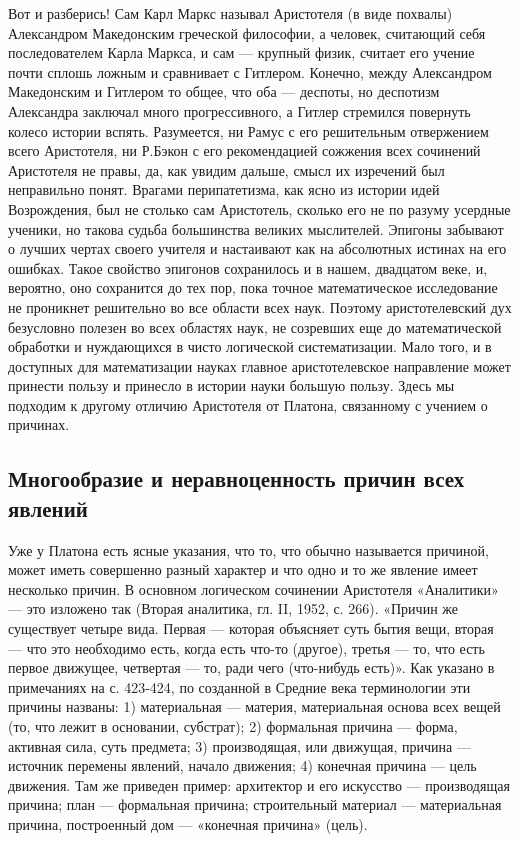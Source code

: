 Вот и разберись! Сам Карл Маркс называл Аристотеля (в виде похвалы)
Александром Македонским греческой философии, а человек, считающий себя
последователем Карла Маркса, и сам --- крупный физик, считает его
учение почти сплошь ложным и сравнивает с Гитлером. Конечно, между
Александром Македонским и Гитлером то общее, что оба --- деспоты, но
деспотизм Александра заключал много прогрессивного, а Гитлер стремился
повернуть колесо истории вспять. Разумеется, ни Рамус с его
решительным отвержением всего Аристотеля, ни Р.Бэкон с его
рекомендацией сожжения всех сочинений Аристотеля не правы, да, как
увидим дальше, смысл их изречений был неправильно понят. Врагами
перипатетизма, как ясно из истории идей Возрождения, был не столько
сам Аристотель, сколько его не по разуму усердные ученики, но такова
судьба большинства великих мыслителей. Эпигоны забывают о лучших
чертах своего учителя и настаивают как на абсолютных истинах на его
ошибках. Такое свойство эпигонов сохранилось и в нашем, двадцатом
веке, и, вероятно, оно сохранится до тех пор, пока точное
математическое исследование не проникнет решительно во все области
всех наук. Поэтому аристотелевский дух безусловно полезен во всех
областях наук, не созревших еще до математической обработки и
нуждающихся в чисто логической систематизации. Мало того, и в
доступных для математизации науках главное аристотелевское направление
может принести пользу и принесло в истории науки большую пользу.
Здесь мы подходим к другому отличию Аристотеля от Платона, связанному
с учением о причинах.

\subsection{Многообразие и неравноценность причин всех явлений}

Уже у Платона есть ясные указания, что то, что обычно называется
причиной, может иметь совершенно разный характер и что одно и то же
явление имеет несколько причин. В основном логическом сочинении
Аристотеля «Аналитики» --- это изложено так (Вторая аналитика, гл. II,
1952, с. 266). «Причин же существует четыре вида. Первая --- которая
объясняет суть бытия вещи, вторая --- что это необходимо есть, когда
есть что-то (другое), третья --- то, что есть первое движущее,
четвертая --- то, ради чего (что-нибудь есть)». Как указано в
примечаниях на с. 423-424, по созданной в Средние века терминологии
эти причины названы: 1) материальная --- материя, материальная основа
всех вещей (то, что лежит в основании, субстрат); 2) формальная
причина --- форма, активная сила, суть предмета; 3) производящая, или
движущая, причина --- источник перемены явлений, начало движения; 4)
конечная причина --- цель движения. Там же приведен пример: архитектор
и его искусство --- производящая причина; план --- формальная причина;
строительный материал --- материальная причина, построенный дом ---
«конечная причина» (цель).


